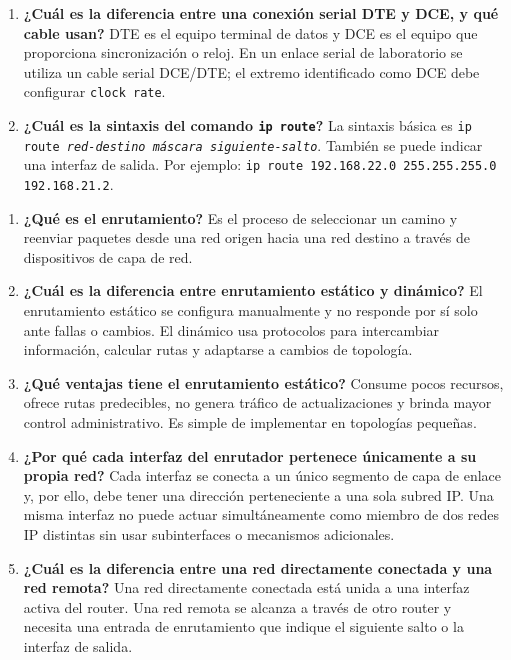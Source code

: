 \documentclass[a4paper,12pt]{article}
\begin{document}
\begin{enumerate}[label=6.1.\alph*)]
    \item \textbf{¿Cuál es la diferencia entre una conexión serial DTE y DCE, y qué cable usan?} DTE es el equipo terminal de datos y DCE es el equipo que proporciona sincronización o reloj. En un enlace serial de laboratorio se utiliza un cable serial DCE/DTE; el extremo identificado como DCE debe configurar \texttt{clock rate}.
    \item \textbf{¿Cuál es la sintaxis del comando \texttt{ip route}?} La sintaxis básica es \texttt{ip route \textit{red-destino} \textit{máscara} \textit{siguiente-salto}}. También se puede indicar una interfaz de salida. Por ejemplo: \texttt{ip route 192.168.22.0 255.255.255.0 192.168.21.2}.
\end{enumerate}

\begin{enumerate}[label=6.2.\alph*)]
    \item \textbf{¿Qué es el enrutamiento?} Es el proceso de seleccionar un camino y reenviar paquetes desde una red origen hacia una red destino a través de dispositivos de capa de red.
    \item \textbf{¿Cuál es la diferencia entre enrutamiento estático y dinámico?} El enrutamiento estático se configura manualmente y no responde por sí solo ante fallas o cambios. El dinámico usa protocolos para intercambiar información, calcular rutas y adaptarse a cambios de topología.
    \item \textbf{¿Qué ventajas tiene el enrutamiento estático?} Consume pocos recursos, ofrece rutas predecibles, no genera tráfico de actualizaciones y brinda mayor control administrativo. Es simple de implementar en topologías pequeñas.
    \item \textbf{¿Por qué cada interfaz del enrutador pertenece únicamente a su propia red?} Cada interfaz se conecta a un único segmento de capa de enlace y, por ello, debe tener una dirección perteneciente a una sola subred IP. Una misma interfaz no puede actuar simultáneamente como miembro de dos redes IP distintas sin usar subinterfaces o mecanismos adicionales.
    \item \textbf{¿Cuál es la diferencia entre una red directamente conectada y una red remota?} Una red directamente conectada está unida a una interfaz activa del router. Una red remota se alcanza a través de otro router y necesita una entrada de enrutamiento que indique el siguiente salto o la interfaz de salida.
\end{enumerate}
\end{document}
